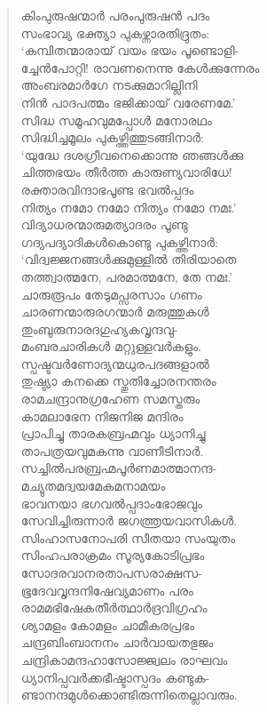 \begin{verse}
കിംപുരുഷന്മാര്‍ പരംപുരുഷന്‍ പദം\\
സംഭാവ്യ ഭക്ത്യാ പുകഴ്ന്നാരതിദ്രുതം:\\
‘കമ്പിതന്മാരായ് വയം ഭയം പൂണ്ടൊളി-\\
ച്ചേന്‍പോറ്റി! രാവണനെന്നു കേള്‍ക്കുന്നേരം\\
അംബരമാര്‍ഗേ നടക്കുമാറില്ലിനി\\
നിന്‍ പാദപത്മം ഭജിക്കായ് വരേണമേ.’\\
സിദ്ധ സമൂഹവുമപ്പോള്‍ മനോരഥം\\
സിദ്ധിച്ചമൂലം പുകഴ്ത്തിത്തുടങ്ങിനാര്‍:\\
‘യുദ്ധേ ദശഗ്രീവനെക്കൊന്നു ഞങ്ങള്‍ക്കു\\
ചിത്തഭയം തീര്‍ത്ത കാരുണ്യവാരിധേ!\\
രക്താരവിന്ദാഭപൂണ്ട ഭവല്‍പ്പദം\\
നിത്യം നമോ നമോ നിത്യം നമോ നമഃ.’\\
വിദ്യാധരന്മാരുമത്യാദരം പൂണ്ടു\\
ഗദ്യപദ്യാദികള്‍കൊണ്ടു പുകഴ്ത്തിനാര്‍:\\
‘വിദ്വജ്ജനങ്ങള്‍ക്കുമുള്ളില്‍ തിരിയാതെ\\
തത്ത്വാത്മനേ, പരമാത്മനേ, തേ നമഃ.’\\
ചാരുരൂപം തേടുമപ്സരസാം ഗണം\\
ചാരണന്മാരുരഗന്മാര്‍ മരുത്തുകള്‍\\
തുംബുരുനാരദഗുഹ്യകവൃന്ദവു-\\
മംബരചാരികള്‍ മറ്റുള്ളവര്‍കളും.\\
സ്പഷ്ടവര്‍ണോദ്യന്മധുരപദങ്ങളാല്‍\\
തുഷ്ട്യാ കനക്കെ സ്തുതിച്ചോരനന്തരം\\
രാമചന്ദ്രാനുഗ്രഹേണ സമസ്തരും\\
കാമലാഭേന നിജനിജ മന്ദിരം\\
പ്രാപിച്ചു താരകബ്രഹ്മവും ധ്യാനിച്ചു\\
താപത്രയവുമകന്നു വാണീടിനാര്‍.\\
സച്ചില്‍പരബ്രഹ്മപൂര്‍ണമാത്മാനന്ദ-\\
മച്യുതമദ്വയമേകമനാമയം\\
ഭാവനയാ ഭഗവല്‍പ്പദാംഭോജവും\\
സേവിച്ചിരുന്നാര്‍ ജഗത്ത്രയവാസികള്‍.\\
സിംഹാസനോപരി സീതയാ സംയുതം\\
സിംഹപരാക്രമം സൂര്യകോടിപ്രഭം\\
സോദരവാനരതാപസരാക്ഷസ-\\
ഭൂദേവവൃന്ദനിഷേവ്യമാണം പരം\\
രാമമഭിഷേകതീര്‍ത്ഥാര്‍ദ്രവിഗ്രഹം\\
ശ്യാമളം കോമളം ചാമീകരപ്രഭം\\
ചന്ദ്രബിംബാനനം ചാര്‍വായതഭുജം\\
ചന്ദ്രികാമന്ദഹാസോജ്ജ്വലം രാഘവം\\
ധ്യാനിപ്പവര്‍ക്കഭീഷ്ടാസ്പദം കണ്ടുക-\\
ണ്ടാനന്ദമുള്‍ക്കൊണ്ടിരുന്നിതെല്ലാവരും.
\end{verse}

